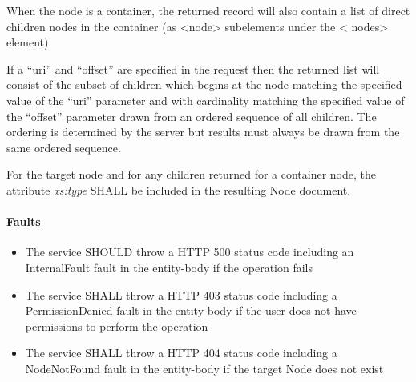 \documentclass[11pt,a4paper]{ivoa}
\begin{document}
When the node is a container, the returned record will also contain a list of direct children nodes in the container (as <node> subelements under the < nodes> element).

If a ``uri'' and ``offset'' are specified in the request then the returned list will consist of the subset of children which begins at the node matching the specified value of the ``uri'' parameter and with cardinality matching the specified value of the ``offset'' parameter drawn from an ordered sequence of all children. The ordering is determined by the server but results must always be drawn from the same ordered sequence.

For the target node and for any children returned for a container node, the attribute \emph{xs:type} SHALL be included in the resulting Node document.  

\paragraph{Faults}
\begin{itemize}
    \item The service SHOULD throw a HTTP 500 status code including an InternalFault fault in the entity-body if the operation fails
    \item The service SHALL throw a HTTP 403 status code including a PermissionDenied fault in the entity-body if the user does not have permissions to perform the operation
    \item The service SHALL throw a HTTP 404 status code including a NodeNotFound fault in the entity-body if the target Node does not exist
\end{itemize}
\end{document}

